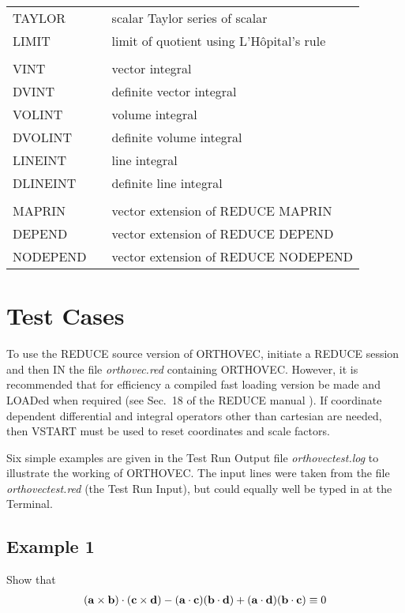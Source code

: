 \begin{table}
\begin{tabular}{|l c l|}
TAYLOR & & scalar Taylor series of scalar \\
LIMIT & & limit of quotient using L'H\^opital's rule \\ & &  \\
VINT & & vector integral \\ 
DVINT & & definite vector integral \\ 
VOLINT & & volume integral \\ 
DVOLINT & & definite volume integral \\ 
LINEINT & & line integral \\ 
DLINEINT & & definite line integral \\  & & \\
MAPRIN & & vector extension of REDUCE MAPRIN \\
DEPEND & & vector extension of REDUCE DEPEND \\
NODEPEND & & vector extension of REDUCE NODEPEND \\ \hline 
\end {tabular}
\end{table}

\section{Test Cases}

To use the REDUCE source version of ORTHOVEC, initiate a REDUCE session 
and then IN the file {\em orthovec.red}
containing ORTHOVEC.  However, it is recommended that for 
efficiency a compiled fast loading version be 
made and LOADed when required (see 
Sec.~18 of the REDUCE manual \cite{r1}).  
If coordinate dependent differential and
integral operators other than cartesian are needed, then VSTART must
be used to reset coordinates and scale factors.

Six  simple examples are given in the Test Run Output file 
{\em orthovectest.log} to illustrate the working of ORTHOVEC.  
The input lines were taken from the file
{\em orthovectest.red} (the Test Run Input), but could 
equally well be typed in at the Terminal.

\subsection{Example 1} 

Show that
\begin{eqnarray*}
({\bf a}  \times {\bf b}) \cdot ({\bf c} \times {\bf d}) - ({\bf a} 
\cdot {\bf c})({\bf b} \cdot {\bf d})
 + ({\bf a} \cdot {\bf d})({\bf b} \cdot {\bf c}) \equiv 0
\end{eqnarray*}
 
